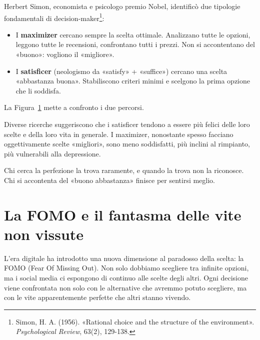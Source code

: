 Herbert Simon, economista e psicologo premio Nobel, identificò due tipologie fondamentali di decision-maker\footnote{Simon, H. A. (1956). «Rational choice and the structure of the environment». \textit{Psychological Review}, 63(2), 129-138.}:

\begin{itemize}
\item I \textbf{maximizer} cercano sempre la scelta ottimale. Analizzano tutte le opzioni, leggono tutte le recensioni, confrontano tutti i prezzi. Non si accontentano del «buono»: vogliono il «migliore».

\item I \textbf{satisficer} (neologismo da «satisfy» + «suffice») cercano una scelta «abbastanza buona». Stabiliscono criteri minimi e scelgono la prima opzione che li soddisfa.
\end{itemize} La Figura~\ref{fig:maximizer_satisficer} mette a confronto i due percorsi.

\begin{figure}[htbp]
	\centering
	\label{fig:maximizer_satisficer}
\end{figure}

Diverse ricerche suggeriscono che i satisficer tendono a essere più felici delle loro scelte e della loro vita in generale. I maximizer, nonostante spesso facciano oggettivamente scelte «migliori», sono meno soddisfatti, più inclini al rimpianto, più vulnerabili alla depressione.

Chi cerca la perfezione la trova raramente, e quando la trova non la riconosce. Chi si accontenta del «buono abbastanza» finisce per sentirsi meglio.

\section{La FOMO e il fantasma delle vite non vissute}
\label{sec:p2c21-fomo}

L'era digitale ha introdotto una nuova dimensione al paradosso della scelta: la FOMO (Fear Of Missing Out). Non solo dobbiamo scegliere tra infinite opzioni, ma i social media ci espongono di continuo alle scelte degli altri. Ogni decisione viene confrontata non solo con le alternative che avremmo potuto scegliere, ma con le vite apparentemente perfette che altri stanno vivendo.

